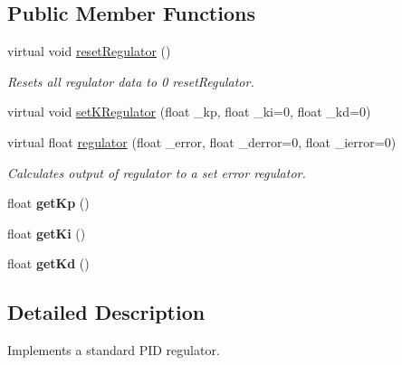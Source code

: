 \subsection*{Public Member Functions}
\begin{DoxyCompactItemize}
\item 
virtual void \hyperlink{classRHATypes_1_1Regulator_ae566e392560fb0f7c6fd801d63ac922e}{reset\+Regulator} ()\hypertarget{classRHATypes_1_1Regulator_ae566e392560fb0f7c6fd801d63ac922e}{}\label{classRHATypes_1_1Regulator_ae566e392560fb0f7c6fd801d63ac922e}

\begin{DoxyCompactList}\small\item\em Resets all regulator data to 0  reset\+Regulator. \end{DoxyCompactList}\item 
virtual void \hyperlink{classRHATypes_1_1Regulator_a31dc1ed1cc246ecd62c30f7bfa0879cb}{set\+K\+Regulator} (float \+\_\+kp, float \+\_\+ki=0, float \+\_\+kd=0)
\item 
virtual float \hyperlink{classRHATypes_1_1Regulator_a177a476f7f92de2bb2df2bd66f249523}{regulator} (float \+\_\+error, float \+\_\+derror=0, float \+\_\+ierror=0)
\begin{DoxyCompactList}\small\item\em Calculates output of regulator to a set error  regulator. \end{DoxyCompactList}\item 
float {\bfseries get\+Kp} ()\hypertarget{classRHATypes_1_1Regulator_a9eb9f18fc1362eb707a049464629f65e}{}\label{classRHATypes_1_1Regulator_a9eb9f18fc1362eb707a049464629f65e}

\item 
float {\bfseries get\+Ki} ()\hypertarget{classRHATypes_1_1Regulator_a5e8428051ac008110c35004d300ce659}{}\label{classRHATypes_1_1Regulator_a5e8428051ac008110c35004d300ce659}

\item 
float {\bfseries get\+Kd} ()\hypertarget{classRHATypes_1_1Regulator_ab47eca13f66abd73b81049011f5c2752}{}\label{classRHATypes_1_1Regulator_ab47eca13f66abd73b81049011f5c2752}

\end{DoxyCompactItemize}


\subsection{Detailed Description}
Implements a standard P\+ID regulator. 

